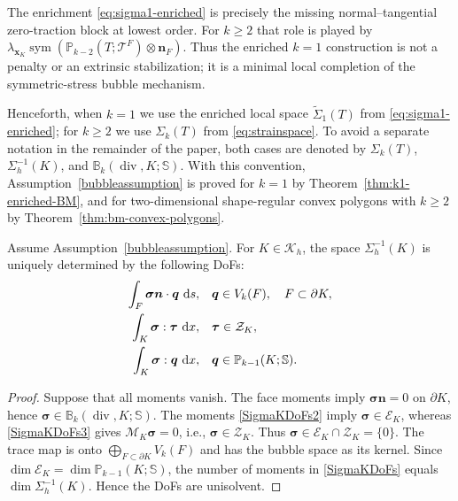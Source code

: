\documentclass[review,hidelinks,onefignum,onetabnum]{siamart251216}
\renewcommand{\div}{\operatorname{div}}
\newcommand{\dx}{\,{\rm d}x}
\newcommand{\ds}{\,{\rm d}s}
\newcommand{\sym}{\operatorname{sym}}
\begin{document}
\begin{remark}\label{rem:k1-unified}
The enrichment \eqref{eq:sigma1-enriched} is precisely the missing
normal--tangential zero-traction block at lowest order.  For $k\ge2$ that
role is played by
$\lambda_{\boldsymbol x_K}\sym(\mathbb P_{k-2}(T;\mathscr T^F)
\otimes\boldsymbol n_F)$.  Thus the enriched $k=1$ construction is not a
penalty or an extrinsic stabilization; it is a minimal local completion of
the symmetric-stress bubble mechanism.
\end{remark}

Henceforth, when $k=1$ we use the enriched local space
$\widetilde\Sigma_1(T)$ from \eqref{eq:sigma1-enriched}; for $k\ge2$ we use
$\Sigma_k(T)$ from \eqref{eq:strainspace}.  To avoid a separate notation in
the remainder of the paper, both cases are denoted by $\Sigma_k(T)$,
$\Sigma_h^{-1}(K)$, and $\mathbb B_k(\div,K;\mathbb S)$.  With this convention,
Assumption~\ref{bubbleassumption} is proved for $k=1$ by
Theorem~\ref{thm:k1-enriched-BM}, and for two-dimensional shape-regular convex
polygons with $k\ge2$ by Theorem~\ref{thm:bm-convex-polygons}.

\begin{lemma}\label{lemma_DOF}
Assume Assumption~\ref{bubbleassumption}. For $K\in\mathcal K_h$, the space
$\Sigma_h^{-1}(K)$ is uniquely determined by the following DoFs:
\begin{subequations}\label{SigmaKDoFs}
\begin{align}
\int_F\boldsymbol\sigma\boldsymbol n\cdot\boldsymbol q\,\ds,
&\quad \boldsymbol q\in V_k(F),\quad F\subset\partial K,\label{SigmaKDoFs1}\\
\int_K\boldsymbol\sigma:\boldsymbol\tau\,\dx,
&\quad \boldsymbol\tau\in\mathcal Z_K,\label{SigmaKDoFs2}\\
\int_K\boldsymbol\sigma:\boldsymbol q\,\dx,
&\quad \boldsymbol q\in\mathbb P_{k-1}(K;\mathbb S).\label{SigmaKDoFs3}
\end{align}
\end{subequations}
\end{lemma}
\begin{proof}
Suppose that all moments vanish.  The face moments imply
$\boldsymbol\sigma\boldsymbol n=0$ on $\partial K$, hence
$\boldsymbol\sigma\in\mathbb B_k(\div,K;\mathbb S)$.  The moments
\eqref{SigmaKDoFs2} imply $\boldsymbol\sigma\in\mathcal E_K$, whereas
\eqref{SigmaKDoFs3} gives $\mathcal M_K\boldsymbol\sigma=0$, i.e.,
$\boldsymbol\sigma\in\mathcal Z_K$.  Thus
$\boldsymbol\sigma\in\mathcal E_K\cap\mathcal Z_K=\{0\}$.
The trace map is onto $\bigoplus_{F\subset\partial K}V_k(F)$ and has the
bubble space as its kernel.  Since
$\dim\mathcal E_K=\dim\mathbb P_{k-1}(K;\mathbb S)$, the number of moments
in \eqref{SigmaKDoFs} equals $\dim\Sigma_h^{-1}(K)$.  Hence the DoFs are
unisolvent.
\end{proof}
\end{document}
